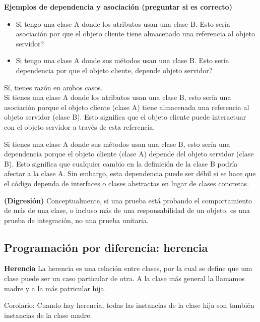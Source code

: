 \documentclass[../main.tex]{subfiles}
\begin{document}
        \begin{example} \textbf{Ejemplos de dependencia y asociación (preguntar si es correcto)}
            \begin{itemize}
                \item Si tengo una clase A donde los atributos usan una clase B. Esto sería asociación por que el objeto cliente tiene almacenado una referencia al objeto servidor?
                \item Si tengo una clase A donde sus métodos usan una clase B. Esto sería dependencia por que el objeto cliente, depende objeto servidor?
            \end{itemize}

            Sí, tienes razón en ambos casos.\\

            Si tienes una clase A donde los atributos usan una clase B, esto sería una asociación porque el objeto cliente (clase A) tiene almacenada una referencia al objeto servidor (clase B). Esto significa que el objeto cliente puede interactuar con el objeto servidor a través de esta referencia.

            Si tienes una clase A donde sus métodos usan una clase B, esto sería una dependencia porque el objeto cliente (clase A) depende del objeto servidor (clase B). Esto significa que cualquier cambio en la definición de la clase B podría afectar a la clase A. Sin embargo, esta dependencia puede ser débil si se hace que el código dependa de interfaces o clases abstractas en lugar de clases concretas.
        \end{example}

        \begin{definition} \textbf{(Digresión)}
            Conceptualmente, si una prueba está probando el comportamiento de más de una clase, o incluso más de una responsabilidad de un objeto, es una prueba de integración, no una prueba unitaria.
        \end{definition}

    \subsection{Programación por diferencia: herencia}
        \begin{definition} \textbf{Herencia}
            La herencia es una relación entre clases, por la cual se define que una clase puede ser un caso particular de otra. A la clase más general la llamamos madre y a la más patricular hija.

            Corolario:
            Cuando hay herencia, todas las instancias de la clase hija son también instancias de la clase madre.
            
        \end{definition}
\end{document}

